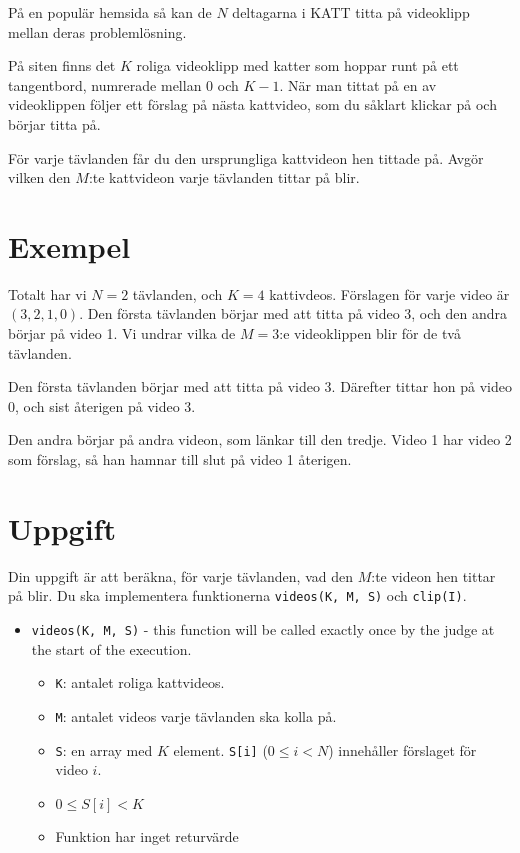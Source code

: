 \newcommand\version{v1}
På en populär hemsida så kan de $N$ deltagarna i KATT titta på videoklipp mellan deras problemlösning.

På siten finns det $K$ roliga videoklipp med katter som hoppar runt på ett tangentbord, numrerade mellan $0$ och $K - 1$.
När man tittat på en av videoklippen följer ett förslag på nästa kattvideo, som du såklart klickar på och börjar titta på.

För varje tävlanden får du den ursprungliga kattvideon hen tittade på. Avgör vilken den $M$:te kattvideon varje tävlanden tittar på blir.

\section*{Exempel}
Totalt har vi $N = 2$ tävlanden, och $K = 4$ kattivdeos.
Förslagen för varje video är $(3, 2, 1, 0)$. Den första tävlanden börjar med att titta på video 3, och den andra börjar på video 1.
Vi undrar vilka de $M = 3$:e videoklippen blir för de två tävlanden.

Den första tävlanden börjar med att titta på video 3. Därefter tittar hon på video 0, och sist återigen på video 3.

Den andra börjar på andra videon, som länkar till den tredje. Video 1 har video 2 som förslag, så han hamnar till slut på video 1 återigen.

\section*{Uppgift}
Din uppgift är att beräkna, för varje tävlanden, vad den $M$:te videon hen tittar på blir.
Du ska implementera funktionerna \texttt{videos(K, M, S)} och \texttt{clip(I)}.

\begin{itemize}
  \item \texttt{videos(K, M, S)} - this function will be called exactly once by the judge at the start of the execution.
  \begin{itemize}
    \item \texttt{K}: antalet roliga kattvideos.
    \item \texttt{M}: antalet videos varje tävlanden ska kolla på.
    \item \texttt{S}: en array med $K$ element. \texttt{S[i]} ($0 \le i < N$) innehåller förslaget för video $i$.
		\item $0 \le S[i] < K$
    \item Funktion har inget returvärde
  \end{itemize}
\end{itemize}

